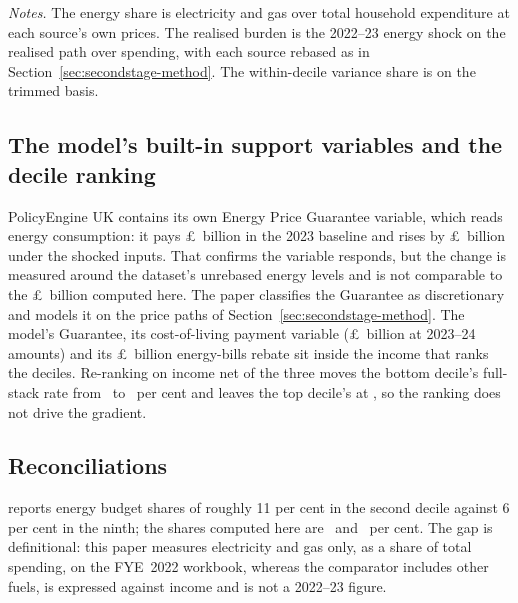 \begin{table}[tbp]
\centering
\caption{Energy spending by income decile: Microcosm UK against the Living Costs and Food Survey}
\label{tab:lcfs}
\footnotesize\setlength{\tabcolsep}{4pt}
\resizebox{\textwidth}{!}{}
\begin{minipage}{.94\textwidth}\footnotesize
\emph{Notes.} The energy share is electricity and gas over total
household expenditure at each source's own prices. The realised burden
is the 2022--23 energy shock on the realised path over spending, with
each source rebased as in Section~\ref{sec:secondstage-method}. The
within-decile variance share is on the trimmed basis.
\end{minipage}
\end{table}

\subsection{The model's built-in support variables and the decile ranking}\label{app:native}

PolicyEngine UK contains its own Energy Price Guarantee variable,
which reads energy consumption: it pays \pounds\SsNativeEpgBn\ billion
in the 2023 baseline and rises by \pounds\SsNativeEpgDeltaBn\ billion
under the shocked inputs. That confirms the variable responds, but the
change is measured around the dataset's unrebased energy levels and is
not comparable to the \pounds\SsEpgBn\ billion computed here. The
paper classifies the Guarantee as discretionary and models it on the
price paths of Section~\ref{sec:secondstage-method}. The model's
Guarantee, its cost-of-living payment variable
(\pounds\SsNativeColBn\ billion at 2023--24 amounts) and its
\pounds\SsNativeEbrBn\ billion energy-bills rebate sit inside the
income that ranks the deciles. Re-ranking on income net of the three
moves the bottom decile's full-stack rate from \SsRankBaseDOne\ to
\SsRankNetDOne\ per cent and leaves the top decile's at
\SsRankNetDTen, so the ranking does not drive the gradient.

\subsection{Reconciliations}\label{app:recon}

 \citet{rf2022} reports energy budget shares of roughly 11 per cent in the second
decile against 6 per cent in the ninth; the shares computed here are
\MsEnergyBudgetSharePctDecTwo\ and \MsEnergyBudgetSharePctDecNine\ per
cent. The gap is definitional: this paper measures electricity and gas
only, as a share of total spending, on the FYE~2022 workbook, whereas
the comparator includes other fuels, is expressed against income and
is not a 2022--23 figure.

